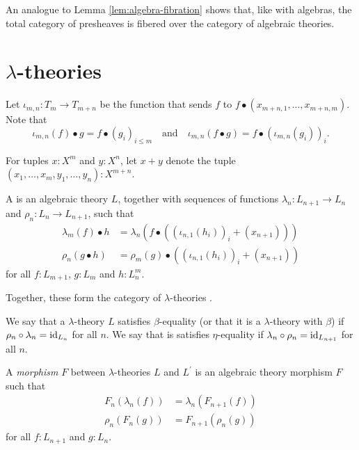 An analogue to Lemma \ref{lem:algebra-fibration} shows that, like with algebras, the total category of presheaves is fibered over the category of algebraic theories.

\section{\texorpdfstring{$ \lambda $-}{lambda-}theories}

Let $ \iota_{m, n} : T_m \to T_{m + n} $ be the function that sends $ f $ to $ f \bullet (x_{m + n, 1}, \dots, x_{m + n, m}) $. Note that
\[ \iota_{m, n}(f) \bullet g = f \bullet (g_i)_{i \leq m} \quad \text{and} \quad \iota_{m, n}(f \bullet g) = f \bullet (\iota_{m, n}(g_i))_i. \]

For tuples $ x : X^m $ and $ y: X^n $, let $ x + y $ denote the tuple $ (x_1, \dots, x_m, y_1, \dots, y_n) : X^{m + n} $.

\begin{definition}
  A  is an algebraic theory $ L $, together with sequences of functions $ \lambda_n: L_{n + 1} \to L_n $ and $ \rho_n: L_n \to L_{n + 1} $, such that
  \begin{align*}
    \lambda_m(f) \bullet h &= \lambda_n(f \bullet ((\iota_{n, 1}(h_i))_i + (x_{n + 1})))\\
    \rho_n(g \bullet h) &= \rho_m(g) \bullet ((\iota_{n, 1}(h_i))_i + (x_{n + 1}))
  \end{align*}
  for all $ f: L_{m + 1} $, $ g: L_m $ and $ h: L_n^m $.
\end{definition}

Together, these form the category of $ \lambda $-theories \iindex{$ \LamTh $}.

\begin{definition}
  We say that a $ \lambda $-theory $ L $ satisfies $ \beta $-equality (or that it is a $ \lambda $-theory with $ \beta $) if $ \rho_n \circ \lambda_n = \text{id}_{L_n} $ for all $ n $. We say that is satisfies $ \eta $-equality if $ \lambda_n \circ \rho_n = \text{id}_{L_{n + 1}} $ for all $ n $.
\end{definition}

\begin{definition}
  A \textit{morphism} $ F $ between $ \lambda $-theories $ L $ and $ L^\prime $ is an algebraic theory morphism $ F $ such that
  \begin{align*}
    F_n(\lambda_n(f)) &= \lambda_n(F_{n + 1}(f))\\
    \rho_n(F_n(g)) &= F_{n + 1}(\rho_n(g))
  \end{align*}
  for all $ f: L_{n + 1} $ and $ g: L_n $.
\end{definition}

